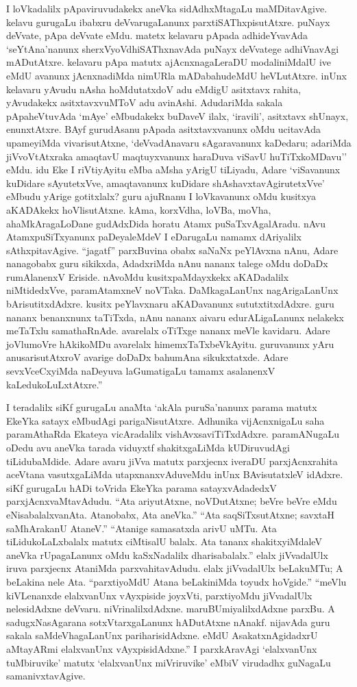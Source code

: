 I loVkadalilx pApaviruvudakekx aneVka sidAdhxMtagaLu maMDitavAgive. kelavu gurugaLu ibabxru deVvarugaLanunx parxtiSAThxpisutAtxre. puNayx deVvate, pApa deVvate eMdu. matetx kelavaru pApada adhideYvavAda `seYtAna'nanunx sherxVyoVdhiSAThxnavAda puNayx deVvatege adhiVnavAgi mADutAtxre. kelavaru pApa matutx ajAcnxnagaLeraDU modaliniMdalU ive eMdU avanunx jAcnxnadiMda nimURla mADabahudeMdU heVLutAtxre. inUnx kelavaru yAvudu nAsha hoMdutatxdoV adu eMdigU asitxtavx rahita, yAvudakekx asitxtavxvuMToV adu avinAshi. AdudariMda sakala pApaheVtuvAda `mAye' eMbudakekx buDaveV ilalx, `iravili', asitxtavx shUnayx, enunxtAtxre. BAyf gurudAsanu pApada asitxtavxvanunx oMdu ucitavAda upameyiMda vivarisutAtxne, `deVvadAnavaru sAgaravanunx kaDedaru; adariMda jiVvoVtAtxraka amaqtavU maqtuyxvanunx haraDuva viSavU huTiTxkoMDavu'' eMdu. idu Eke I riVtiyAyitu eMba aMsha yArigU tiLiyadu, Adare `viSavanunx kuDidare sAyutetxVve, amaqtavanunx kuDidare shAshavxtavAgirutetxVve' eMbudu yArige gotitxlalx? guru ajuRnanu I loVkavanunx oMdu kusitxya aKADAkekx hoVlisutAtxne. kAma, korxVdha, loVBa, moVha, ahaMkAragaLoDane gudAdxDida horatu Atamx puSaTxvAgalAradu. nAvu AtamxpuSiTxyanunx paDeyaleMdeV I eDarugaLu namamx dAriyalilx sAthxpitavAgive. ``jagatf'' parxBuvina obabx saNaNx peYlAvxna nAnu, Adare nanagobabx guru sikikxda, AdadxriMda nAnu nananx talege oMdu doDaDx rumAlanenxV Eriside. nAvoMdu kusitxpaMdayxkekx aKADadalilx niMtidedxVve, paramAtamxneV noVTaka. DaMkagaLanUnx nagArigaLanUnx bArisutitxdAdxre. kusitx peYlavxnaru aKADavanunx sututxtitxdAdxre. guru nananx benanxnunx taTiTxda, nAnu nananx aivaru edurALigaLanunx nelakekx meTaTxlu samathaRnAde. avarelalx oTiTxge nananx meVle kavidaru. Adare joVlumoVre hAkikoMDu avarelalx himemxTaTxbeVkAyitu. guruvanunx yAru anusarisutAtxroV avarige doDaDx bahumAna sikukxtatxde. Adare sevxVceCxyiMda naDeyuva laGumatigaLu tamamx asalanenxV kaLedukoLuLxtAtxre.''

I teradalilx siKf gurugaLu anaMta `akAla puruSa'nanunx parama matutx EkeYka satayx eMbudAgi parigaNisutAtxre. Adhunika vijAcnxnigaLu saha paramAthaRda Ekateya vicAradalilx vishAvxsaviTiTxdAdxre. paramANugaLu oDedu avu aneVka tarada viduyxtf shakitxgaLiMda kUDiruvudAgi tiLidubaMdide. Adare avaru jiVva matutx parxjecnx iveraDU parxjAcnxrahita aceVtana vasutxgaLiMda utapxnanxvAduveMdu inUnx BAvisutatxleV idAdxre. siKf gurugaLu hADi toVrida EkeYka parama satayxvAdadedxV parxjAcnxvaMtavAdudu. ``Ata ariyutAtxne, noVDutAtxne; beVre beVre eMdu eNisabalalxvanAta. Atanobabx, Ata aneVka.'' ``Ata saqSiTxsutAtxne; savxtaH saMhArakanU AtaneV.'' ``Atanige samasatxda arivU uMTu. Ata tiLidukoLaLxbalalx matutx ciMtisalU balalx. Ata tananx shakitxyiMdaleV aneVka rUpagaLanunx oMdu kaSxNadalilx dharisabalalx.'' elalx jiVvadalUlx iruva parxjecnx AtaniMda parxvahitavAdudu. elalx jiVvadalUlx beLakuMTu; A beLakina nele Ata. ``parxtiyoMdU Atana beLakiniMda toyudx hoVgide.'' ``meVlu kiVLenanxde elalxvanUnx vAyxpiside joyxVti, parxtiyoMdu jiVvadalUlx nelesidAdxne deVvaru. niVrinalilxdAdxne. maruBUmiyalilxdAdxne parxBu. A sadugxNasAgarana sotxVtarxgaLanunx hADutAtxne nAnakf. nijavAda guru sakala saMdeVhagaLanUnx pariharisidAdxne. eMdU AsakatxnAgidadxrU aMtayARmi elalxvanUnx vAyxpisidAdxne.'' I parxkAravAgi `elalxvanUnx tuMbiruvike' matutx `elalxvanUnx miVriruvike' eMbiV virudadhx guNagaLu samanivxtavAgive.

